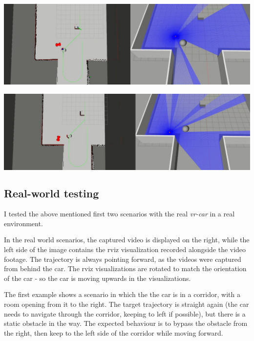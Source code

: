 \begin{center}
    \vspace{0.5cm}
    \includegraphics[width=\textwidth]{figures/raw/jpeg/local_planner_test_curved_traj_2_static_objects_5.jpg}

    \vspace{0.5cm}
    \includegraphics[width=\textwidth]{figures/raw/jpeg/local_planner_test_curved_traj_2_static_objects_6.jpg}

    \label{local_planner_test_curved_traj_2_static_objects}
\end{center}

\subsection{Real-world testing}
\label{chap:real_world_testing}
I tested the above mentioned first two scenarios with the real \textit{vr-car} in a real environment.

In the real world scenarios, the captured video is displayed on the right, while the left side of the image contains the rviz visualization recorded alongside the video footage. The trajectory is always pointing forward, as the videos were captured from behind the car. The rviz visualizations are rotated to match the orientation of the car - so the car is moving upwards in the visualizations.

The first example shows a scenario in which the the car is in a corridor, with a room opening from it to the right. The target trajectory is straight again (the car needs to navigate through the corridor, keeping to left if possible), but there is a static obstacle in the way. The expected behaviour is to bypass the obstacle from the right, then keep to the left side of the corridor while moving forward.

